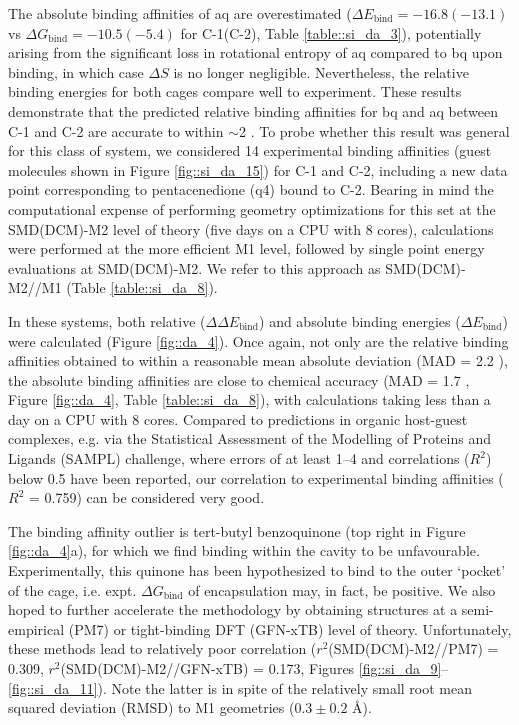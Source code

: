 \documentclass[../../main.tex]{subfiles}
\begin{document}
The absolute binding affinities of aq are overestimated ($\Delta E_\text{bind}= -16.8 (-13.1)$ vs $\Delta G_\text{bind} = -10.5 (-5.4)$ \kcalx for C-1(C-2), Table \ref{table::si_da_3}), potentially arising from the significant loss in rotational entropy of aq compared to bq upon binding, in which case $\Delta S$ is no longer negligible. Nevertheless, the relative binding energies for both cages compare well to experiment. These results demonstrate that the predicted relative binding affinities for bq and aq between C-1 and C-2 are accurate to within $\sim$2 \kcal. To probe whether this result was general for this class of system, we considered 14 experimental binding affinities (guest molecules shown in Figure \ref{fig::si_da_15}) for C-1 and C-2, including a new data point corresponding to pentacenedione (q4) bound to C-2. Bearing in mind the computational expense of performing geometry optimizations for this set at the SMD(DCM)-M2 level of theory (five days on a CPU with 8 cores), calculations were performed at the more efficient M1 level, followed by single point energy evaluations at SMD(DCM)-M2. We refer to this approach as SMD(DCM)-M2//M1 (Table \ref{table::si_da_8}).

In these systems, both relative ($\Delta\Delta E_\text{bind}$) and absolute binding energies ($\Delta E_\text{bind}$) were calculated (Figure \ref{fig::da_4}). Once again, not only are the relative binding affinities obtained to within a reasonable mean absolute deviation (MAD = 2.2 \kcal), the absolute binding affinities are close to chemical accuracy (MAD = 1.7 \kcal, Figure \ref{fig::da_4}, Table \ref{table::si_da_8}), with calculations taking less than a day on a CPU with 8 cores. Compared to predictions in organic host-guest complexes, e.g. via the Statistical Assessment of the Modelling of Proteins and Ligands (SAMPL) challenge, where errors of at least 1–4 \kcalx and correlations ($R^2$) below 0.5 have been reported, our correlation to experimental binding affinities ($R^2$ = 0.759) can be considered very good.\cite{Sure2015, Jensen2015, Rizzi2018}
 
The binding affinity outlier is tert-butyl benzoquinone (top right in Figure \ref{fig::da_4}a), for which we find binding within the cavity to be unfavourable. Experimentally, this quinone has been hypothesized to bind to the outer ‘pocket’ of the cage, i.e. expt. $\Delta G_\text{bind}$ of encapsulation may, in fact, be positive. We also hoped to further accelerate the methodology by obtaining structures at a semi-empirical (PM7\cite{Stewart2012}) or tight-binding DFT (GFN-xTB\cite{Grimme2017xtb}) level of theory. Unfortunately, these methods lead to relatively poor correlation ($r^2$(SMD(DCM)-M2//PM7) = 0.309, $r^2$(SMD(DCM)-M2//GFN-xTB) = 0.173, Figures \ref{fig::si_da_9}--\ref{fig::si_da_11}). Note the latter is in spite of the relatively small root mean squared deviation (RMSD) to M1 geometries ($0.3\pm0.2$ \AA). 
\end{document}
